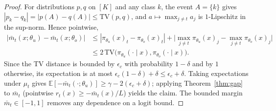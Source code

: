 \begin{proof}
For distributions $p,q$ on $[K]$ and any class $k$, the event $A=\{k\}$ gives
$|p_k - q_k| = |p(A)-q(A)| \leq \mathrm{TV}(p,q)$, and $a \mapsto \max_{j\neq t}
a_j$ is $1$-Lipschitz in the sup-norm. Hence pointwise,
\begin{align*}
|\bar m_t(x;\theta_u) - \bar m_t(x;\theta_o)|
&\leq |\pi_{\theta_u}(x)_t-\pi_{\theta_o}(x)_t|
 + \bigl|\max_{j\neq t}\pi_{\theta_u}(x)_j - \max_{j\neq t}\pi_{\theta_o}(x)_j\bigr| \\
&\leq 2\,\mathrm{TV}\bigl(\pi_{\theta_u}(\cdot \mid x), \pi_{\theta_o}(\cdot \mid x)\bigr) .
\end{align*}
Since the TV distance is bounded by $\epsilon_c$ with probability $1-\delta$ and by $1$ otherwise, its expectation is at most $\epsilon_c(1-\delta) + \delta \leq \epsilon_c + \delta$.
Taking expectations under $\mu_t$ gives $\mathbb{E}[-\bar m_t(\cdot;\theta_u)]
\geq \gamma - 2(\epsilon_c + \delta)$; applying Theorem~\ref{thm:gap} to $\bar m_t$
(pointwise $r_t(x) \geq -\bar m_t(x)/L$) yields the claim. The bounded margin $\bar m_t \in [-1,1]$ removes any dependence on a logit bound.
\end{proof}

